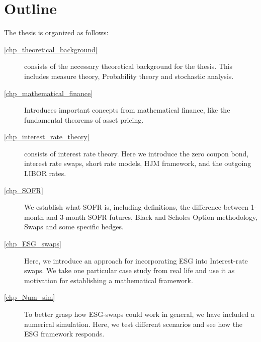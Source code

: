 \chapter{Outline}
\label{intro}
\begin{comment}
The rest of the text is organised as follows. This is an example of a description list; see more lists in \cref{discussion} and \vref{tab14}.    
\end{comment}

The thesis is organized as follows: 
\begin{description}
    \item[\cref{chp_theoretical_background}] consists of the necessary theoretical background for the thesis. This includes measure theory, Probability theory and stochastic analysis. 

    \item[\cref{chp_mathematical_finance}] Introduces important concepts from mathematical finance, like the fundamental theorems of asset pricing. 

    \item[\cref{chp_interest_rate_theory}] consists of interest rate theory. Here we introduce the zero coupon bond, interest rate swaps, short rate models, HJM framework, and the outgoing LIBOR rates.

    \item[\cref{chp_SOFR}] We establish what SOFR is, including definitions, the difference between 1-month and 3-month SOFR futures, Black and Scholes Option methodology, Swaps and some specific hedges.

    \item[\cref{chp_ESG_swaps}] Here, we introduce an approach for incorporating ESG into Interest-rate swaps. We take one particular case study from real life and use it as motivation for establishing a mathematical framework. 

    \item[\cref{chp_Num_sim}] To better grasp how ESG-swaps could work in general, we have included a numerical simulation. Here, we test different scenarios and see how the ESG framework responds.     


\end{description}
